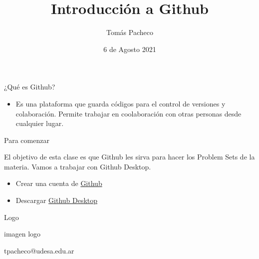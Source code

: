 \documentclass{beamer}					%
\title{Introducción a Github}
\author{Tom\'as Pacheco}
\institute{Econom\'ia Aplicada - Universidad de San Andr\'es}
\date{6 de Agosto 2021}
\begin{document}
\begin{frame}
  \titlepage
\end{frame}

\begin{frame}{¿Qué es Github?}

\begin{itemize}
    \item Es una plataforma que guarda c\'odigos para el control de versiones y colaboraci\'on. Permite trabajar en coolaboraci\'on con otras personas desde cualquier lugar. 
\end{itemize}
\end{frame}

\begin{frame}{Para comenzar}

El objetivo de esta clase es que Github les sirva para hacer los Problem Sets de la materia. Vamos a trabajar con Github Desktop.
\begin{itemize}
    \item Crear una cuenta de \href{https://bit.ly/3kuoEd4}{Github} 
    \item Descargar \href{https://desktop.github.com/}{Github Desktop}
\end{itemize}  
\end{frame}

\begin{frame}{Logo}

\begin{center}
imagen logo
\end{center}

\end{frame}



\begin{frame}{}
\begin{huge}
\begin{center}
    tpacheco@udesa.edu.ar
\end{center}
\end{huge}
\end{frame}
\end{document}
